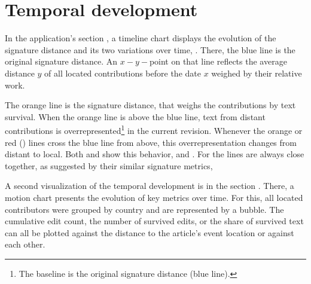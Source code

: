 


\section{Temporal development}


In the application's section , a timeline chart displays the evolution of the signature distance and its two variations over time, .
There, the blue line is the original signature distance.
An $x-y-$point on that line reflects the average distance $y$ of all located contributions before the date $x$ weighed by their relative work.



The orange line is the  signature distance, that weighs the contributions by text survival.
When the orange line is above the blue line, text from distant contributions is overrepresented\footnote{The baseline is the original signature distance (blue line).} in the current revision.
Whenever the orange or red () lines cross the blue line from above, this overrepresentation changes from distant to local.
Both  and  show this behavior,   and  .
For  the lines are always close together, as suggested by their similar signature metrics,  

A second visualization of the temporal development is in the section .
There, a motion chart presents the evolution of key metrics over time.
For this, all located contributors were grouped by country and are represented by a bubble. 
The cumulative edit count, the number of survived edits, or the share of survived text can all be plotted against the distance to the article's event location or against each other.

